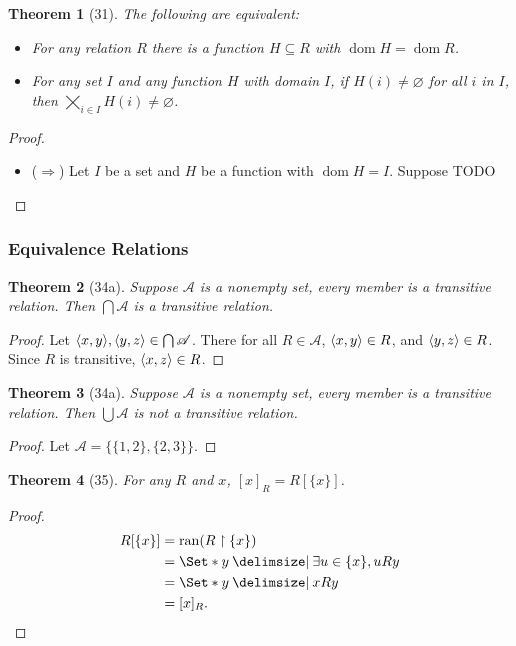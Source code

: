 \documentclass[12pt]{article}
\theoremstyle{plain}
\newtheorem*{exthm}{Theorem}
\theoremstyle{remark}
\theoremstyle{definition}
\theoremstyle{remark}
\providecommand\st{}
\newcommand\SetSymbol[1][]{%
  \nonscript\:#1\vert%
  \allowbreak%
  \nonscript\:
\mathopen{}}
\DeclarePairedDelimiter{\ang}{\langle}{\rangle}
\renewcommand\st{\SetSymbol[\delimsize]}
\DeclareMathOperator{\dom}{dom}
\DeclareMathOperator{\ran}{ran}
\begin{document}
\begin{exthm}[31]
  The following are equivalent:
  \begin{itemize}
    \item For any relation $R$ there is a function $H \subseteq R$ with $\dom{H} = \dom{R}$.
    \item For any set $I$ and any function $H$ with domain $I$, if $H(i) \neq \varnothing$ for all $i$ in $I$, then $\bigtimes_{i \in I} H(i) \neq \varnothing$.
\end{itemize}
\end{exthm}
\begin{proof}
  \begin{itemize}
    \item ($\Rightarrow$) Let $I$ be a set and $H$ be a function with $\dom{H} = I$. Suppose
      TODO
  \end{itemize}
\end{proof}

\subsubsection{Equivalence Relations}

\begin{exthm}[34a]
  Suppose $\mathscr{A}$ is a nonempty set, every member is a transitive relation. Then $\bigcap \mathscr{A}$ is a transitive relation.
\end{exthm}
\begin{proof}
  Let $\ang{x,y}, \ang{y,z} \in \bigcap \mathscr{A}$. There for all $R \in \mathscr{A}$, $\ang{x,y} \in R$, and $\ang{y,z} \in R$. Since $R$ is transitive, $\ang{x, z} \in R$.
\end{proof}

\begin{exthm}[34a]
  Suppose $\mathscr{A}$ is a nonempty set, every member is a transitive relation. Then $\bigcup \mathscr{A}$ is not a transitive relation.
\end{exthm}
\begin{proof}
  Let $\mathscr{A} = \{\{1, 2\}, \{2, 3\}\}$.
\end{proof}

\begin{exthm}[35]
  For any $R$ and $x$, $[x]_R = R[\{x\}]$.
\end{exthm}
\begin{proof}
  \begin{align*}
    R[\{x\}] &= \ran(R \restriction \{x\})\\
             &= \Set*{y \st \exists u \in \{x\}, uRy}\\
             &= \Set*{y \st xRy}\\
             &= [x]_R.
  \end{align*}
\end{proof}
\end{document}
